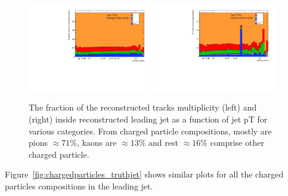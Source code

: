 \begin{figure}[b]
\centering
\includegraphics[width=0.48\textwidth,page=1]{figures/jetcompstudy_MultiplicityFraction.pdf}
\includegraphics[width=0.48\textwidth,page=1]{figures/jet_comp_study_powheg_Tight_pTFraction_mc16e.pdf}%
\caption {The fraction of the reconstructed tracks multiplicity (left) and \pT (right) inside reconstructed leading jet as a function of jet pT for various categories. From charged particle compositions, mostly are pions $\approx71$\%, kaons are $\approx13$\% and rest $\approx16$\% comprise other charged particle.}
\label{fig:chargedparticles}
\end{figure}

Figure~\ref{fig:chargedparticles_truthjet} shows similar plots for all the charged particles compositions in the leading jet.

